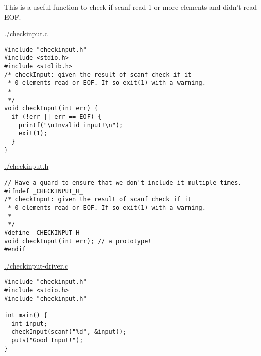 \documentclass[11pt]{article}
\begin{document}
This is a useful function to check if scanf read 1 or more elements
and didn't read EOF.

\url{./checkinput.c}

\begin{verbatim}
#include "checkinput.h"
#include <stdio.h>
#include <stdlib.h>
/* checkInput: given the result of scanf check if it 
 * 0 elements read or EOF. If so exit(1) with a warning.
 *
 */
void checkInput(int err) {
  if (!err || err == EOF) {
    printf("\nInvalid input!\n");
    exit(1);
  }
}
\end{verbatim}

\url{./checkinput.h}

\begin{verbatim}
// Have a guard to ensure that we don't include it multiple times.
#ifndef _CHECKINPUT_H_
/* checkInput: given the result of scanf check if it 
 * 0 elements read or EOF. If so exit(1) with a warning.
 *
 */
#define _CHECKINPUT_H_
void checkInput(int err); // a prototype!
#endif
\end{verbatim}

\url{./checkinput-driver.c}

\begin{verbatim}
#include "checkinput.h"
#include <stdio.h>
#include "checkinput.h"

int main() {
  int input;
  checkInput(scanf("%d", &input));  
  puts("Good Input!");
}
\end{verbatim}
\end{document}
